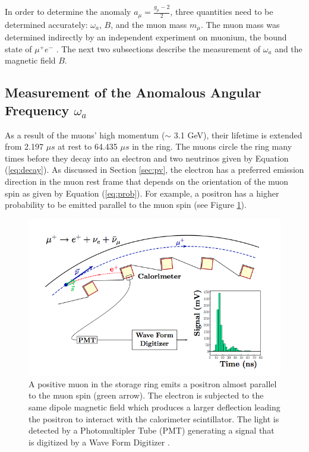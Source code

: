 \documentclass{outhesis}
\begin{document}
In order to determine the anomaly $\displaystyle a_{\mu} = \frac{g_{\mu}-2}{2}$, three quantities need to be determined accurately: $\omega_a$, $B$, and the muon mass $m_{\mu}$. The muon mass was determined indirectly by an independent experiment on muonium, the bound state of $\mu^+e^-$ \cite{zeeman}. The next two subsections describe the measurement of $\omega_a$ and the magnetic field $B$.

\subsection{Measurement of the Anomalous Angular Frequency $\omega_a$}

As a result of the muons' high momentum ($\sim$ 3.1 GeV), their lifetime is extended from 2.197 $\mu s$ at rest to 64.435 $\mu s$ in the ring. The muons circle the ring many times before they decay into an electron and two neutrinos given by Equation (\ref{eq:decay}). As discussed in Section \ref{sec:pv}, the electron has a preferred emission direction in the muon rest frame that depends on the orientation of the muon spin as given by Equation (\ref{eq:prob}). For example, a positron has a higher probability to be emitted parallel to the muon spin (see Figure \ref{fig:det}). 
\begin{figure}
  \centering
  \includegraphics[scale=0.5]{figures/detection}
  \caption[Electron detection in the storage ring.]{A positive muon in the storage ring emits a positron almost parallel to the muon spin (green arrow). The electron is subjected to the same dipole magnetic field which produces a larger deflection leading the positron to interact with the calorimeter scintillator. The light is detected by a Photomultipler Tube (PMT) generating a signal that is digitized by a Wave Form Digitizer \cite{phen}.}
  \label{fig:det}
\end{figure}
\end{document}
